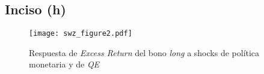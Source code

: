 \documentclass[../../entrega.tex]{subfiles}
\begin{document}
\subsection{Inciso (h)}
\begin{figure}[!htb]
	\centering
	\texttt{[image: swz\_figure2.pdf]}
	\caption{Respuesta de \emph{Excess Return} del bono \emph{long} a shocks de política monetaria y de \emph{QE}}
	\label{fig:swz2}
\end{figure}
\FloatBarrier
\end{document}
